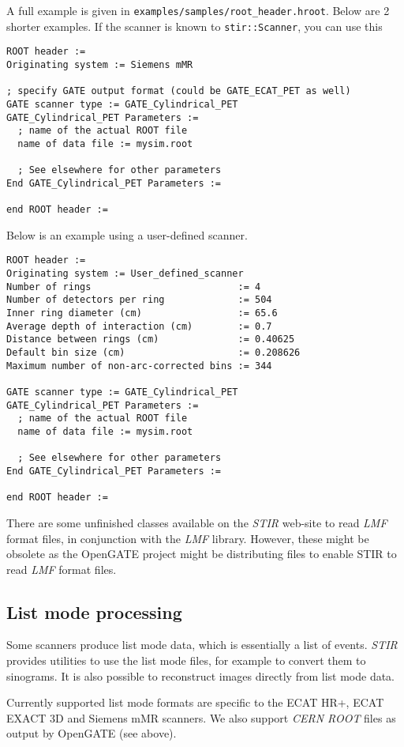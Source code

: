 \documentclass{article}
\begin{document}
A full example is given in \texttt{examples/samples/root\_header.hroot}. Below are
2 shorter examples.
If the scanner is known to \texttt{stir::Scanner}, you can use this
\begin{verbatim}
ROOT header := 
Originating system := Siemens mMR

; specify GATE output format (could be GATE_ECAT_PET as well)
GATE scanner type := GATE_Cylindrical_PET
GATE_Cylindrical_PET Parameters :=
  ; name of the actual ROOT file
  name of data file := mysim.root

  ; See elsewhere for other parameters
End GATE_Cylindrical_PET Parameters :=

end ROOT header := 
\end{verbatim}
Below is an example using a user-defined scanner. 
\begin{verbatim}
ROOT header := 
Originating system := User_defined_scanner
Number of rings                          := 4
Number of detectors per ring             := 504
Inner ring diameter (cm)                 := 65.6
Average depth of interaction (cm)        := 0.7
Distance between rings (cm)              := 0.40625
Default bin size (cm)                    := 0.208626
Maximum number of non-arc-corrected bins := 344

GATE scanner type := GATE_Cylindrical_PET
GATE_Cylindrical_PET Parameters :=
  ; name of the actual ROOT file
  name of data file := mysim.root

  ; See elsewhere for other parameters
End GATE_Cylindrical_PET Parameters :=

end ROOT header := 
\end{verbatim}

There are some unfinished classes
available on the \textit{STIR} web-site to read \textit{LMF} format files,
in conjunction with the \textit{LMF} library. However, these might be obsolete
as the OpenGATE project might be distributing files
to enable STIR to read \textit{LMF} format files.

\subsection{
List mode processing}

Some scanners produce list mode data, which is essentially a 
list of events. \textit{STIR} provides utilities to use
the list mode files, for example to convert them to sinograms. It is
also possible to reconstruct images directly from list mode data.

Currently supported list mode formats are specific to the ECAT 
HR+, ECAT EXACT 3D and Siemens mMR scanners. We also support \textit{CERN ROOT} files
as output by OpenGATE (see above).
\end{document}
